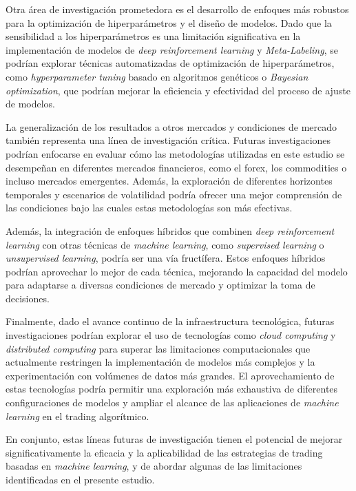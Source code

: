 \documentclass[a4paper,12pt, twoside]{report}
\begin{document}
Otra área de investigación prometedora es el desarrollo de enfoques más robustos para 
la optimización de hiperparámetros y el diseño de modelos. Dado que la sensibilidad a 
los hiperparámetros es una limitación significativa en la implementación de modelos de 
\textit{deep reinforcement learning} y \textit{Meta-Labeling}, se podrían explorar 
técnicas automatizadas de optimización de hiperparámetros, como \textit{hyperparameter tuning} 
basado en algoritmos genéticos o \textit{Bayesian optimization}, que podrían mejorar la 
eficiencia y efectividad del proceso de ajuste de modelos.

La generalización de los resultados a otros mercados y condiciones de mercado también 
representa una línea de investigación crítica. Futuras investigaciones podrían enfocarse 
en evaluar cómo las metodologías utilizadas en este estudio se desempeñan en diferentes 
mercados financieros, como el forex, los commodities o incluso mercados emergentes. Además, 
la exploración de diferentes horizontes temporales y escenarios de volatilidad podría 
ofrecer una mejor comprensión de las condiciones bajo las cuales estas metodologías son 
más efectivas.

Además, la integración de enfoques híbridos que combinen \textit{deep reinforcement learning} 
con otras técnicas de \textit{machine learning}, como \textit{supervised learning} o 
\textit{unsupervised learning}, podría ser una vía fructífera. Estos enfoques híbridos 
podrían aprovechar lo mejor de cada técnica, mejorando la capacidad del modelo para 
adaptarse a diversas condiciones de mercado y optimizar la toma de decisiones.

Finalmente, dado el avance continuo de la infraestructura tecnológica, futuras 
investigaciones podrían explorar el uso de tecnologías como \textit{cloud computing} 
y \textit{distributed computing} para superar las limitaciones computacionales que 
actualmente restringen la implementación de modelos más complejos y la experimentación 
con volúmenes de datos más grandes. El aprovechamiento de estas tecnologías podría 
permitir una exploración más exhaustiva de diferentes configuraciones de modelos y 
ampliar el alcance de las aplicaciones de \textit{machine learning} en el trading algorítmico.

En conjunto, estas líneas futuras de investigación tienen el potencial de mejorar 
significativamente la eficacia y la aplicabilidad de las estrategias de trading basadas 
en \textit{machine learning}, y de abordar algunas de las limitaciones identificadas 
en el presente estudio.





\end{document}
